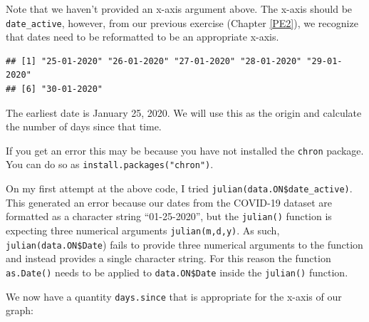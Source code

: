 \documentclass[]{book}
\newenvironment{Shaded}{\begin{snugshade}}{\end{snugshade}}
\newcommand{\KeywordTok}[1]{\textcolor[rgb]{0.13,0.29,0.53}{\textbf{{#1}}}}
\newcommand{\DataTypeTok}[1]{\textcolor[rgb]{0.13,0.29,0.53}{{#1}}}
\newcommand{\StringTok}[1]{\textcolor[rgb]{0.31,0.60,0.02}{{#1}}}
\newcommand{\NormalTok}[1]{{#1}}
\begin{document}
Note that we haven't provided an x-axis argument above. The x-axis
should be \texttt{date\_active}, however, from our previous exercise
(Chapter \ref{PE2}), we recognize that dates need to be reformatted to
be an appropriate x-axis.

\begin{Shaded}
\end{Shaded}

\begin{verbatim}
## [1] "25-01-2020" "26-01-2020" "27-01-2020" "28-01-2020" "29-01-2020"
## [6] "30-01-2020"
\end{verbatim}

The earliest date is January 25, 2020. We will use this as the origin
and calculate the number of days since that time.

\begin{Shaded}
\end{Shaded}

If you get an error this may be because you have not installed the
\texttt{chron} package. You can do so as
\texttt{install.packages("chron")}.

On my first attempt at the above code, I tried
\texttt{julian(data.ON\$date\_active)}. This generated an error because
our dates from the COVID-19 dataset are formatted as a character string
``01-25-2020'', but the \texttt{julian()} function is expecting three
numerical arguments \texttt{julian(m,d,y)}. As such,
\texttt{julian(data.ON\$Date}) fails to provide three numerical
arguments to the function and instead provides a single character
string. For this reason the function \texttt{as.Date()} needs to be
applied to \texttt{data.ON\$Date} inside the \texttt{julian()} function.

We now have a quantity \texttt{days.since} that is appropriate for the
x-axis of our graph:

\begin{Shaded}
\end{Shaded}
\end{document}
